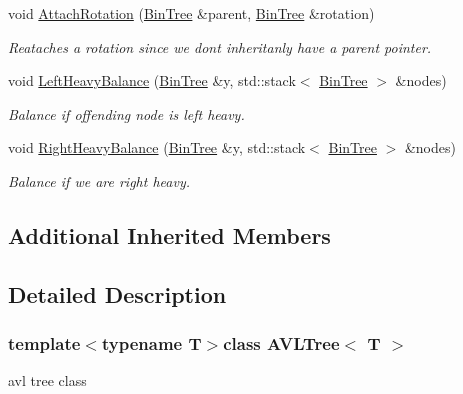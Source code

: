 \begin{DoxyCompactItemize}
void \hyperlink{classAVLTree_a0ae4359dfca1abb5f18a7b4a3b80ebb8}{Attach\-Rotation} (\hyperlink{classBSTree_ae961195e523a45be64a981840e953b67}{Bin\-Tree} \&parent, \hyperlink{classBSTree_ae961195e523a45be64a981840e953b67}{Bin\-Tree} \&rotation)
\begin{DoxyCompactList}\small\item\em Reataches a rotation since we dont inheritanly have a parent pointer. \end{DoxyCompactList}\item 
void \hyperlink{classAVLTree_ac3f380ad5c5fd3175333a95adeba6174}{Left\-Heavy\-Balance} (\hyperlink{classBSTree_ae961195e523a45be64a981840e953b67}{Bin\-Tree} \&y, std\-::stack$<$ \hyperlink{classBSTree_ae961195e523a45be64a981840e953b67}{Bin\-Tree} $>$ \&nodes)
\begin{DoxyCompactList}\small\item\em Balance if offending node is left heavy. \end{DoxyCompactList}\item 
void \hyperlink{classAVLTree_abce0a7342b0663127c8ff9b633bb765f}{Right\-Heavy\-Balance} (\hyperlink{classBSTree_ae961195e523a45be64a981840e953b67}{Bin\-Tree} \&y, std\-::stack$<$ \hyperlink{classBSTree_ae961195e523a45be64a981840e953b67}{Bin\-Tree} $>$ \&nodes)
\begin{DoxyCompactList}\small\item\em Balance if we are right heavy. \end{DoxyCompactList}\end{DoxyCompactItemize}
\subsection*{Additional Inherited Members}


\subsection{Detailed Description}
\subsubsection*{template$<$typename T$>$class A\-V\-L\-Tree$<$ T $>$}

avl tree class 

